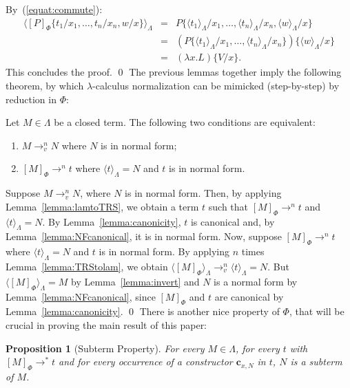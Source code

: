 \documentclass{LMCS}
\newcommand{\varone}{x}
\newcommand{\lambdaone}{M}
\newcommand{\lambdatwo}{N}
\newcommand{\lambdathree}{L}
\newcommand{\lambdafour}{P}
\newcommand{\valueone}{V}
\newcommand{\termone}{t}
\newcommand{\termfour}{w}
\newcommand{\constr}[2]{\mathbf{c}_{#1,#2}}
\newcommand{\LambdatoTRS}[1]{[#1]_{\Phi}}
\newcommand{\TRStolambda}[1]{\langle{#1}\rangle_{\Lambdaterms}}
\newcommand{\Lambdaterms}{\Lambda}
\newcommand{\TRS}{\Phi}
\newcommand{\rewrTRS}{\rightarrow}
\newcommand{\rewrlambdav}{\rightarrow_v}
\newtheorem{proposition}{Proposition}
\begin{document}
By~(\ref{equat:commute}):
\begin{eqnarray*}
\TRStolambda{\LambdatoTRS{\lambdafour}\{\termone_1/\varone_1,\ldots,\termone_n/\varone_n,\termfour/\varone\}}&=&
   \lambdafour\{\TRStolambda{\termone_1}/\varone_1,\ldots,\TRStolambda{\termone_n}/\varone_n,\TRStolambda{\termfour}/\varone\}\\
&=&(\lambdafour\{\TRStolambda{\termone_1}/\varone_1,\ldots,\TRStolambda{\termone_n}/\varone_n\})\{\TRStolambda{\termfour}/\varone\}\\
&=&(\lambda\varone.\lambdathree)\{\valueone/\varone\}.
\end{eqnarray*}
This concludes the proof.
\qed
The previous lemmas together imply the following theorem, by which $\lambda$-calculus
normalization can be mimicked (step-by-step) by reduction in $\TRS$:
\begin{thm}\label{theo:termreducible}
Let $\lambdaone\in\Lambdaterms$ be a closed term. The following
two conditions are equivalent:
\begin{enumerate}[\em 1.]
\item
  $\lambdaone\rewrlambdav^n\lambdatwo$ where $\lambdatwo$ is in normal form;
\item
  $\LambdatoTRS{\lambdaone}\rewrTRS^n\termone$ where
  $\TRStolambda{\termone}=\lambdatwo$ and $\termone$ is in normal form.
\end{enumerate}
\end{thm}
\proof
Suppose $\lambdaone\rewrlambdav^n\lambdatwo$, where $\lambdatwo$ is in normal form. 
Then, by applying Lemma~\ref{lemma:lamtoTRS}, we obtain a term $\termone$ such that
$\LambdatoTRS{\lambdaone}\rewrTRS^n\termone$ and $\TRStolambda{\termone}=\lambdatwo$.
By Lemma~\ref{lemma:canonicity}, $\termone$ is canonical and, by Lemma~\ref{lemma:NFcanonical}, 
it is in normal form. Now, suppose $\LambdatoTRS{\lambdaone}\rewrTRS^n\termone$ where
$\TRStolambda{\termone}=\lambdatwo$ and $\termone$ is in normal form. By
applying $n$ times Lemma~\ref{lemma:TRStolam}, we obtain
$\TRStolambda{\LambdatoTRS{\lambdaone}}\rewrlambdav^n\TRStolambda{\termone}=\lambdatwo$.
But $\TRStolambda{\LambdatoTRS{\lambdaone}}=\lambdaone$ by Lemma~\ref{lemma:invert}
and $\lambdatwo$ is a normal form by Lemma~\ref{lemma:NFcanonical}, since $\LambdatoTRS{\lambdaone}$ and $\termone$ are
canonical by Lemma~\ref{lemma:canonicity}.
\qed
There is another nice property of $\TRS$, that will be crucial in proving the main
result of this paper:
\begin{proposition}[Subterm Property]\label{prop:constred}
For every $\lambdaone\in\Lambdaterms$, for every $\termone$ with $\LambdatoTRS{\lambdaone}\rewrTRS^*\termone$
and for every occurrence of a constructor $\constr{\varone}{\lambdatwo}$ in $\termone$, $\lambdatwo$ is
a subterm of $\lambdaone$.
\end{proposition}
\end{document}
